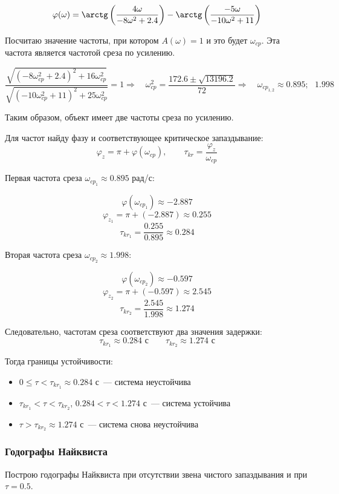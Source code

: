 \documentclass[a4paper,12pt]{article}
\begin{document}
	
	\[\varphi(\omega) = \arctg \left(\dfrac{4\omega}{-8 \omega^2 + 2.4} \right) - \arctg \left(\dfrac{-5 \omega}{-10\omega^2 + 11} \right)\]
	
	Посчитаю значение частоты, при котором \(A(\omega) = 1\) и это будет \(\omega_{cp}\). Эта частота является частотой среза по усилению.
	
	\[	\dfrac{ \sqrt{ (-8 \omega_{cp}^2 + 2.4)^2 + 16\omega_{cp}^2 } }{ \sqrt{ (-10 \omega_{cp}^2 + 11)^2 + 25\omega_{cp}^2 } } = 1 
	\Longrightarrow \quad
	\omega_{cp}^2 =
	\frac{172.6 \pm \sqrt{13196.2}}{72}
	\Longrightarrow \quad
	\omega_{cp_{1,2}} \approx 0.895;\text{ } 1.998
	\]
	
	Таким образом, объект имеет две частоты среза по усилению.
	
	Для частот найду фазу и соответствующее критическое запаздывание:
	\[
	\varphi_{z}=\pi+\varphi(\omega_{cp}),
	\qquad
	\tau_{kr}=\frac{\varphi_{z}}{\omega_{cp}}
	\]
	
	Первая частота среза \(\omega_{cp_1} \approx 0.895\) рад/с:
	
	\[
	\varphi(\omega_{cp_1}) \approx -2.887
	\]
	\[
	\varphi_{z_1} = \pi + (-2.887) \approx 0.255
	\]
	\[
	\tau_{kr_1} = \frac{0.255}{0.895} \approx 0.284
	\]
	
	Вторая частота среза \(\omega_{cp_2} \approx 1.998\):
	
	\[
	\varphi(\omega_{cp_2}) \approx -0.597
	\]
	\[
	\varphi_{z_2} = \pi + (-0.597) \approx 2.545
	\]
	\[
	\tau_{kr_2} = \frac{2.545}{1.998} \approx 1.274
	\]
	
	Следовательно, частотам среза соответствуют два значения задержки:
	\[
	\tau_{kr_1} \approx 0.284 \text{ с} \qquad \tau_{kr_2} \approx 1.274 \text{ с}
	\]
	
	Тогда границы устойчивости:
	\begin{itemize}
		\item \(0 \leq \tau < \tau_{kr_1} \approx 0.284\) с~--- система неустойчива
		\item \(\tau_{kr_1} < \tau < \tau_{kr_2}\), \(0.284 < \tau < 1.274\) с~---
		система устойчива
		\item \(\tau > \tau_{kr_2} \approx 1.274\) с~--- система снова неустойчива
	\end{itemize}

	
	\newpage
	\subsubsection{Годографы Найквиста}
	
	Построю годографы Найквиста при отсутствии звена чистого запаздывания и при \(\tau = 0.5\). 
	
\end{document}
